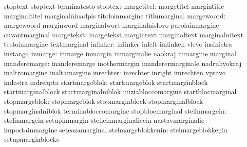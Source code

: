                                   stoptext                         stoptext
                                  terminatesto                     stoptext
                      margetitel: margetitel                       margintitle
                                  marginaltitel                    marginalninadpis
                                  titoloinmargine                  titlumarginal
                      margewoord: margewoord                       marginword
                                  marginalwort                     marginalnislovo
                                  parolainmargine                  cuvantmarginal
                      margetekst: margetekst                       margintext
                                  marginaltext                     marginalnitext
                                  testoinmargine                   textmarginal
                        inlinker: inlinker                         inleft
                                  imlinken                         vlevo
                                  insinistra                       instanga
                         inmarge: inmarge                          inmargin
                                  inmarginalie                     naokraj
                                  inmargine                        marginal
                   inanderemarge: inanderemarge                    inothermargin
                                  inanderermarginale               nadruhyokraj
                                  inaltromargine                   inaltamargine
                       inrechter: inrechter                        inright
                                  imrechten                        vpravo
                                  indestra                         indreapta
                  startmargeblok: startmargeblok                   startmarginblock
                                  startmarginalblock               startmarginalniblok
                                  iniziabloccomargine              startblocmarginal
                   stopmargeblok: stopmargeblok                    stopmarginblock
                                  stopmarginalblock                stopmarginalniblok
                                  terminabloccomargine             stopblocmarginal
                   stelinmargein: stelinmargein                    setupinmargin
                                  stelleinmarginalieein            nastavmarginalie
                                  impostainmargine                 seteazamarginal
              stelmargeblokkenin: stelmargeblokkenin               setupmarginblocks
